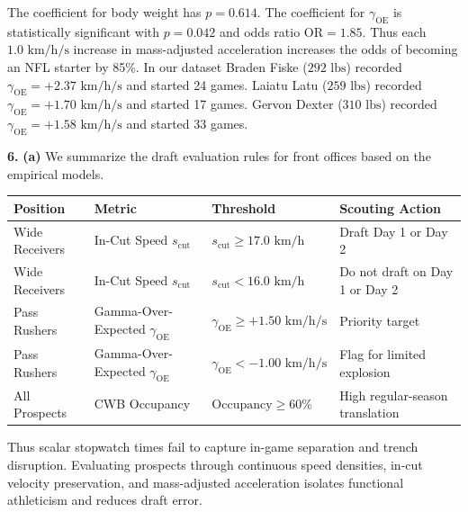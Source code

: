 \documentclass[11pt]{article}
\begin{document}
The coefficient for body weight has $p = 0.614$. The coefficient for $\gamma_{\text{OE}}$ is statistically significant with $p = 0.042$ and odds ratio $\text{OR} = 1.85$. Thus each $1.0 \text{ km/h/s}$ increase in mass-adjusted acceleration increases the odds of becoming an NFL starter by 85\%. In our dataset Braden Fiske ($292 \text{ lbs}$) recorded $\gamma_{\text{OE}} = +2.37 \text{ km/h/s}$ and started 24 games. Laiatu Latu ($259 \text{ lbs}$) recorded $\gamma_{\text{OE}} = +1.70 \text{ km/h/s}$ and started 17 games. Gervon Dexter ($310 \text{ lbs}$) recorded $\gamma_{\text{OE}} = +1.58 \text{ km/h/s}$ and started 33 games.

\noindent\textbf{6.}
\noindent\textbf{(a)}
We summarize the draft evaluation rules for front offices based on the empirical models.

\begin{center}
\small
\setlength{\tabcolsep}{3.5pt}
\begin{tabular}{llll}
\toprule
\textbf{Position} & \textbf{Metric} & \textbf{Threshold} & \textbf{Scouting Action} \\
\midrule
Wide Receivers & In-Cut Speed $s_{\text{cut}}$ & $s_{\text{cut}} \ge 17.0 \text{ km/h}$ & Draft Day 1 or Day 2 \\
Wide Receivers & In-Cut Speed $s_{\text{cut}}$ & $s_{\text{cut}} < 16.0 \text{ km/h}$ & Do not draft on Day 1 or Day 2 \\
Pass Rushers & Gamma-Over-Expected $\gamma_{\text{OE}}$ & $\gamma_{\text{OE}} \ge +1.50 \text{ km/h/s}$ & Priority target \\
Pass Rushers & Gamma-Over-Expected $\gamma_{\text{OE}}$ & $\gamma_{\text{OE}} < -1.00 \text{ km/h/s}$ & Flag for limited explosion \\
All Prospects & CWB Occupancy & $\text{Occupancy} \ge 60\%$ & High regular-season translation \\
\bottomrule
\end{tabular}
\end{center}

Thus scalar stopwatch times fail to capture in-game separation and trench disruption. Evaluating prospects through continuous speed densities, in-cut velocity preservation, and mass-adjusted acceleration isolates functional athleticism and reduces draft error.
\end{document}
